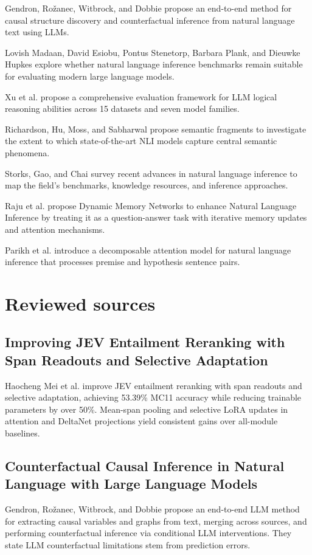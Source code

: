 \documentclass[runningheads]{llncs}
\begin{document}
Gendron, Rožanec, Witbrock, and Dobbie propose an end-to-end method for causal structure discovery and counterfactual inference from natural language text using LLMs. \cite{gendron2024counterfactual}

Lovish Madaan, David Esiobu, Pontus Stenetorp, Barbara Plank, and Dieuwke Hupkes explore whether natural language inference benchmarks remain suitable for evaluating modern large language models. \cite{madaan2024lost}

Xu et al. propose a comprehensive evaluation framework for LLM logical reasoning abilities across 15 datasets and seven model families. \cite{xu2023large}

Richardson, Hu, Moss, and Sabharwal propose semantic fragments to investigate the extent to which state-of-the-art NLI models capture central semantic phenomena. \cite{richardson2020probing}

Storks, Gao, and Chai survey recent advances in natural language inference to map the field's benchmarks, knowledge resources, and inference approaches. \cite{storks2019recent}

Raju et al. propose Dynamic Memory Networks to enhance Natural Language Inference by treating it as a question-answer task with iterative memory updates and attention mechanisms. \cite{raju2017dynamic}

Parikh et al. introduce a decomposable attention model for natural language inference that processes premise and hypothesis sentence pairs. \cite{parikh2016decomposable}

\section{Reviewed sources}
\subsection{Improving JEV Entailment Reranking with Span Readouts and Selective Adaptation}
Haocheng Mei et al. improve JEV entailment reranking with span readouts and selective adaptation, achieving 53.39\% MC11 accuracy while reducing trainable parameters by over 50\%. Mean-span pooling and selective LoRA updates in attention and DeltaNet projections yield consistent gains over all-module baselines. \cite{mei2026improving}

\subsection{Counterfactual Causal Inference in Natural Language with Large Language Models}
Gendron, Rožanec, Witbrock, and Dobbie propose an end-to-end LLM method for extracting causal variables and graphs from text, merging across sources, and performing counterfactual inference via conditional LLM interventions. They state LLM counterfactual limitations stem from prediction errors. \cite{gendron2024counterfactual}
\end{document}

